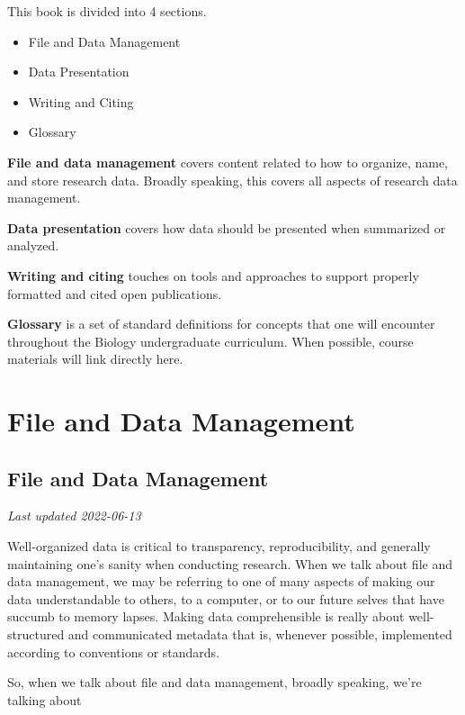 \documentclass[
]{book}
\providecommand{\tightlist}{%
  \setlength{\itemsep}{0pt}\setlength{\parskip}{0pt}}
\begin{document}
This book is divided into 4 sections.

\begin{itemize}
\tightlist
\item
  File and Data Management
\item
  Data Presentation
\item
  Writing and Citing
\item
  Glossary
\end{itemize}

\textbf{File and data management} covers content related to how to organize, name, and store research data. Broadly speaking, this covers all aspects of research data management.

\textbf{Data presentation} covers how data should be presented when summarized or analyzed.

\textbf{Writing and citing} touches on tools and approaches to support properly formatted and cited open publications.

\textbf{Glossary} is a set of standard definitions for concepts that one will encounter throughout the Biology undergraduate curriculum. When possible, course materials will link directly here.

\hypertarget{part-file-and-data-management}{%
\part*{File and Data Management}\label{part-file-and-data-management}}

\hypertarget{file-and-data-management}{%
\chapter{File and Data Management}\label{file-and-data-management}}

\emph{Last updated 2022-06-13}

Well-organized data is critical to transparency, reproducibility, and generally maintaining one's sanity when conducting research. When we talk about file and data management, we may be referring to one of many aspects of making our data understandable to others, to a computer, or to our future selves that have succumb to memory lapses. Making data comprehensible is really about well-structured and communicated metadata that is, whenever possible, implemented according to conventions or standards.

So, when we talk about file and data management, broadly speaking, we're talking about
\end{document}
